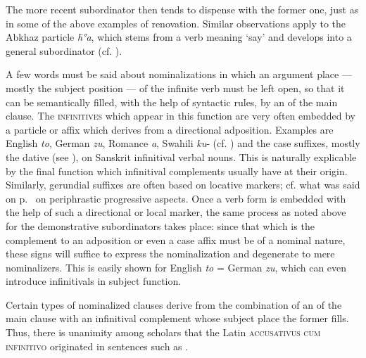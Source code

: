 \noindent The more recent subordinator then tends to dispense with the former one, just as in some of the above examples of renovation. Similar observations apply to the Abkhaz particle \textit{\=h°a}, which stems from a verb meaning ‘say’ and develops into a general subordinator (cf. \citealt[5--8, 28--35, 43]{Hewitt1979}).

A few words must be said about nominalizations in which an argument place — mostly the subject position — of the infinite verb must be left open, so that it can be semantically filled, with the help of syntactic rules, by an \np of the main clause. The \textsc{infinitives} which appear in this function are very often embedded by a particle or affix which derives from a directional adposition. Examples are English \textit{to}, German \textit{zu}, Romance \textit{a}, Swahili \textit{ku}{}- (cf. \citealt{Meinhof1936}) and the case suffixes, mostly the dative (see \citealt[298]{Szemerényi1970}), on Sanskrit infinitival verbal nouns. This is naturally explicable by the final function which infinitival complements usually have at their origin. Similarly, gerundial suffixes are often based on locative markers; cf. what was said on p.~\pageref{page33}\chk%
on periphrastic progressive aspects. Once a verb form is embedded with the help of such a directional or local marker, the same process as noted above for the demonstrative subordinators takes place: since that which is the complement to an adposition or even a case affix must be of a nominal nature, these signs will suffice to express the nominalization and degenerate to mere nominalizers. This is easily shown for English \textit{to} = German \textit{zu}, which can even introduce infinitivals in subject function.

Certain types of nominalized clauses derive from the combination of an \np of the main clause with an infinitival complement whose subject place the former fills. Thus, there is unanimity among scholars that the Latin \textsc{accusativus cum infinitivo} originated in sentences such as .

